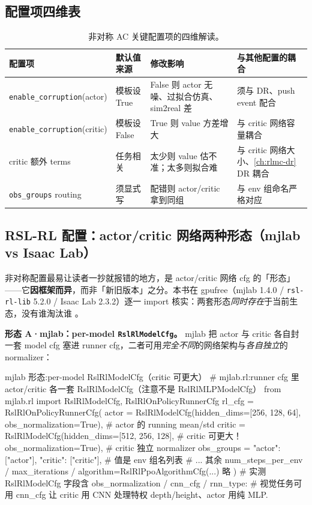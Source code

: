 \subsection{配置项四维表}
\label{sec:rlmc-priv-cfg4d}

\begin{table}[H]
\centering
\small
\caption{非对称 AC 关键配置项的四维解读。}
\label{tab:rlmc-priv-cfg4dim}
\begin{tabular}{@{}p{2.7cm}p{2.7cm}p{2.7cm}p{3.4cm}@{}}
\toprule
配置项 & 默认值来源 & 修改影响 & 与其他配置的耦合 \\
\midrule
\texttt{enable\_corruption}(actor) & 模板设 True & False 则 actor 无噪、过拟合仿真、sim2real 差 & 须与 DR、push event 配合 \\
\texttt{enable\_corruption}(critic) & 模板设 False & True 则 value 方差增大 & 与 critic 网络容量耦合 \\
critic 额外 terms & 任务相关 & 太少则 value 估不准；太多则拟合难 & 与 critic 网络大小、\cref{ch:rlmc-dr} DR 耦合 \\
\texttt{obs\_groups} routing & 须显式写 & 配错则 actor/critic 拿到同组 & 与 env 组命名严格对应 \\
\bottomrule
\end{tabular}
\end{table}

\subsection{RSL-RL 配置：actor/critic 网络两种形态（mjlab vs Isaac Lab）}
\label{sec:rlmc-priv-rslrl4}

非对称配置最易让读者一抄就报错的地方，是 actor/critic 网络 cfg 的「形态」——它\textbf{因框架而异}，而非「新旧版本」之分。本书在 gpufree（mjlab 1.4.0 / \verb|rsl-rl-lib| 5.2.0 / Isaac Lab 2.3.2）逐一 import 核实：两套形态\emph{同时存在}于当前生态，没有谁淘汰谁 \cite{schwarke2025rslrl}。

\textbf{形态 A·mjlab：per-model \texttt{RslRlModelCfg}。} mjlab 把 actor 与 critic 各自封一套 model cfg 塞进 runner cfg，二者可用\emph{完全不同}的网络架构与\emph{各自独立}的 normalizer：

\begin{codebox}[Python]{mjlab 形态:per-model RslRlModelCfg（critic 可更大）}
# mjlab.rl:runner cfg 里 actor/critic 各一套 RslRlModelCfg（注意不是 RslRlMLPModelCfg）
from mjlab.rl import RslRlModelCfg, RslRlOnPolicyRunnerCfg
rl_cfg = RslRlOnPolicyRunnerCfg(
    actor  = RslRlModelCfg(hidden_dims=[256, 128, 64],
                           obs_normalization=True),     # actor 的 running mean/std
    critic = RslRlModelCfg(hidden_dims=[512, 256, 128],  # critic 可更大！
                           obs_normalization=True),     # critic 独立 normalizer
    obs_groups = {"actor": ["actor"], "critic": ["critic"]},  # 值是 env 组名列表
    # ... 其余 num_steps_per_env / max_iterations / algorithm=RslRlPpoAlgorithmCfg(...) 略
)
# 实测 RslRlModelCfg 字段含 obs_normalization / cnn_cfg / rnn_type:
#   视觉任务可用 cnn_cfg 让 critic 用 CNN 处理特权 depth/height、actor 用纯 MLP.
\end{codebox}

